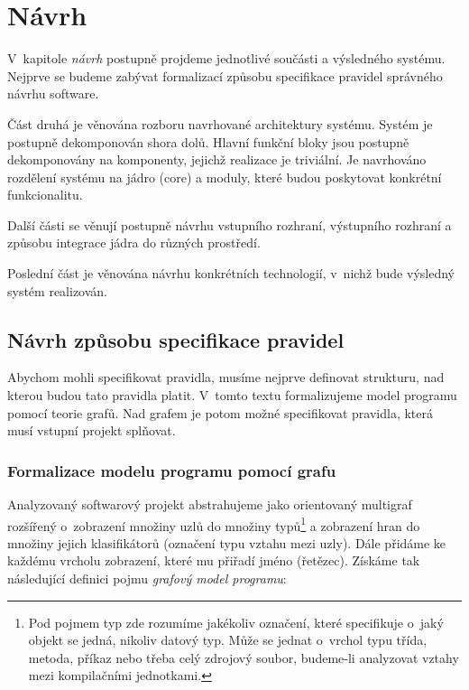 \chapter{Návrh}
\label{design}
V~kapitole \emph{návrh} postupně projdeme jednotlivé součásti a výsledného systému. Nejprve se budeme zabývat formalizací způsobu specifikace pravidel správného návrhu software.

Část druhá je věnována rozboru navrhované architektury systému. Systém je postupně dekomponován shora dolů. Hlavní funkční bloky jsou postupně dekomponovány na komponenty, jejichž realizace je triviální. Je navrhováno rozdělení systému na jádro (core) a moduly, které budou poskytovat konkrétní funkcionalitu.

Další části se věnují postupně návrhu vstupního rozhraní, výstupního rozhraní a způsobu integrace jádra do různých prostředí.

Poslední část je věnována návrhu konkrétních technologií, v~nichž bude výsledný systém realizován.

\section{Návrh způsobu specifikace pravidel}

Abychom mohli specifikovat pravidla, musíme nejprve definovat strukturu, nad kterou budou tato pravidla platit. V~tomto textu formalizujeme model programu pomocí teorie grafů. Nad grafem je potom možné specifikovat pravidla, která musí vstupní projekt splňovat.

\subsection{Formalizace modelu programu pomocí grafu}
\label{design-graph_formalization}

Analyzovaný softwarový projekt abstrahujeme jako orientovaný multigraf rozšířený o~zobrazení množiny uzlů do množiny typů\footnote{Pod pojmem typ zde rozumíme jakékoliv označení, které specifikuje o~jaký objekt se jedná, nikoliv datový typ. Může se jednat o~vrchol typu třída, metoda, příkaz nebo třeba celý zdrojový soubor, budeme-li analyzovat vztahy mezi kompilačními jednotkami.} a zobrazení hran do množiny jejich klasifikátorů (označení typu vztahu mezi uzly). Dále přidáme ke každému vrcholu zobrazení, které mu přiřadí jméno (řetězec). Získáme tak následující definici pojmu \emph{grafový model programu}:


